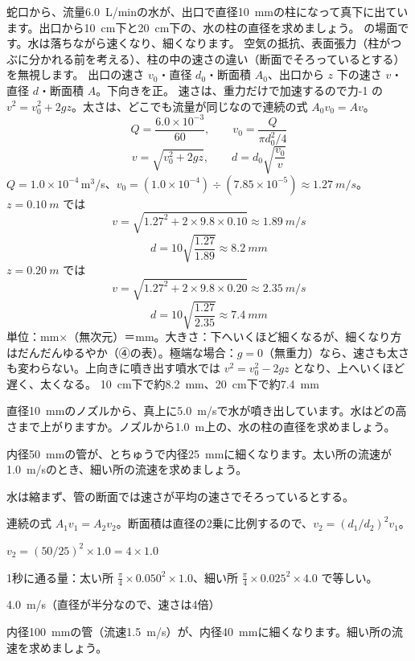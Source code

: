 \begin{phreidai}
\label{ph:力-13:ex1}蛇口から、流量\qty{6.0}{L/min}の水が、出口で直径\qty{10}{mm}の柱になって真下に出ています。出口から\qty{10}{cm}下と\qty{20}{cm}下の、水の柱の直径を求めましょう。
\phbamen
\bkhatenaref の場面です。水は落ちながら速くなり、細くなります。
\phmushi
空気の抵抗、表面張力（柱がつぶに分かれる前を考える）、柱の中の速さの違い（断面でそろっているとする）を無視します。
\phzu
出口の速さ $v_0$・直径 $d_0$・断面積 $A_0$、出口から $z$ 下の速さ $v$・直径 $d$・断面積 $A$。下向きを正。
\phriyu
速さは、重力だけで加速するので力-1 の $v^2=v_0^2+2gz$。太さは、どこでも流量が同じなので連続の式 $A_0v_0=Av$。
\phtateru
\[ Q=\frac{6.0\times10^{-3}}{60},\qquad v_0=\frac{Q}{\pi d_0^2/4} \]
\[ v=\sqrt{v_0^2+2gz},\qquad d=d_0\sqrt{\frac{v_0}{v}} \]
\phtoku
$Q=1.0\times10^{-4}$\,m$^3$/s、$v_0=(1.0\times10^{-4})\div (7.85\times10^{-5})\approx\qty{1.27}{m/s}$。
$z=\qty{0.10}{m}$ では
\[ v=\sqrt{1.27^2+2\times9.8\times0.10}\approx\qty{1.89}{m/s} \]
\[ d=10\sqrt{\frac{1.27}{1.89}}\approx\qty{8.2}{mm} \]
$z=\qty{0.20}{m}$ では
\[ v=\sqrt{1.27^2+2\times9.8\times0.20}\approx\qty{2.35}{m/s} \]
\[ d=10\sqrt{\frac{1.27}{2.35}}\approx\qty{7.4}{mm} \]
\phtashikame
単位：mm×（無次元）＝mm。大きさ：下へいくほど細くなるが、細くなり方はだんだんゆるやか（④の表）。極端な場合：$g=0$（無重力）なら、速さも太さも変わらない。上向きに噴き出す噴水では $v^2=v_0^2-2gz$ となり、上へいくほど遅く、太くなる。
\kotae \qty{10}{cm}下で約\qty{8.2}{mm}、\qty{20}{cm}下で約\qty{7.4}{mm}
\end{phreidai}
\begin{jibun}
直径\qty{10}{mm}のノズルから、真上に\qty{5.0}{m/s}で水が噴き出しています。水はどの高さまで上がりますか。ノズルから\qty{1.0}{m}上の、水の柱の直径を求めましょう。
\end{jibun}

\begin{reidai}[細くなる管]
\label{ph:力-13:ex2}内径\qty{50}{mm}の管が、とちゅうで内径\qty{25}{mm}に細くなります。太い所の流速が\qty{1.0}{m/s}のとき、細い所の流速を求めましょう。
\par{} 水は縮まず、管の断面では速さが平均の速さでそろっているとする。
\par\kangaekata 連続の式 $A_1v_1=A_2v_2$。断面積は直径の2乗に比例するので、$v_2=(d_1/d_2)^2v_1$。
\par\shiki $v_2=(50/25)^2\times1.0=4\times1.0$
\par{} 1秒に通る量：太い所 $\tfrac{\pi}{4}\times0.050^2\times1.0$、細い所 $\tfrac{\pi}{4}\times0.025^2\times4.0$ で等しい。
\par\kotae \qty{4.0}{m/s}（直径が半分なので、速さは4倍）
\end{reidai}
\begin{jibun}
内径\qty{100}{mm}の管（流速\qty{1.5}{m/s}）が、内径\qty{40}{mm}に細くなります。細い所の流速を求めましょう。
\end{jibun}

